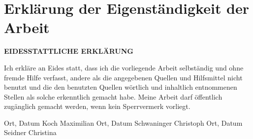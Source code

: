 \chapter*{Erklärung der Eigenständigkeit der Arbeit}
\label{cha:affirmation}


\textbf{EIDESSTATTLICHE ERKLÄRUNG }
\vspace{1cm}

Ich erkläre an Eides statt, dass ich die vorliegende Arbeit selbständig und ohne fremde Hilfe verfasst, andere als die angegebenen Quellen und Hilfsmittel nicht benutzt und die den benutzten Quellen wörtlich und inhaltlich entnommenen Stellen als solche erkenntlich gemacht habe. Meine Arbeit darf öffentlich zugänglich gemacht werden, wenn kein Sperrvermerk vorliegt.

\vfill\vfill



Ort, Datum  \hspace{5cm}Koch Maximilian
\vfill    
Ort, Datum  \hspace{5cm}Schwaninger Christoph                                              
\vfill
Ort, Datum  \hspace{5cm}Seidner Christina
